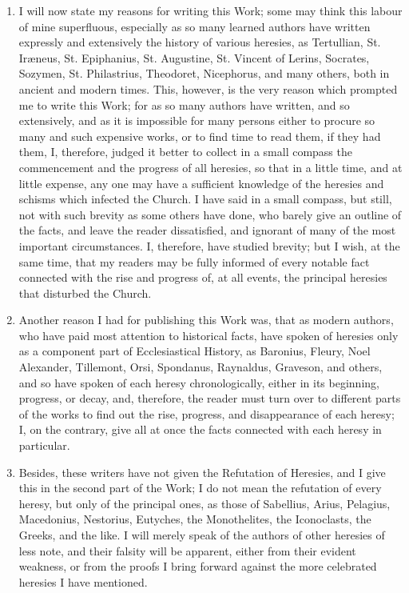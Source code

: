 \documentclass[12pt]{book}
\begin{document}
\begin{enumerate}
\item I will now state my reasons for writing this Work; some may think this labour of mine superfluous,
especially as so many learned authors have written expressly and extensively the history of various
heresies, as Tertullian, St. Ir{\ae}neus, St. Epiphanius, St. Augustine, St. Vincent of Lerins, Socrates,
Sozymen, St. Philastrius, Theodoret, Nicephorus, and many others, both in ancient and modern times.
This, however, is the very reason which prompted me to write this Work; for as so many authors have
written, and so extensively, and as it is impossible for many persons either to procure so many and such 
expensive works, or to find time to read them, if they had them, I, therefore, judged it better to collect in a
small compass the commencement and the progress of all heresies, so that in a little time, and at little
expense, any one may have a sufficient knowledge of the heresies and schisms which infected the
Church. I have said in a small compass, but still, not with such brevity as some others have done, who
barely give an outline of the facts, and leave the reader dissatisfied, and ignorant of many of the most
important circumstances. I, therefore, have studied brevity; but I wish, at the same time, that my readers
may be fully informed of every notable fact connected with the rise and progress of, at all events, the
principal heresies that disturbed the Church.

\item Another reason I had for publishing this Work was, that as modern authors, who have paid most
attention to historical facts, have spoken of heresies only as a component part of Ecclesiastical History, as
Baronius, Fleury, Noel Alexander, Tillemont, Orsi, Spondanus, Raynaldus, Graveson, and others, and so
have spoken of each heresy chronologically, either in its beginning, progress, or decay, and, therefore, the
reader must turn over to different parts of the works to find out the rise, progress, and disappearance of
each heresy; I, on the contrary, give all at once the facts connected with each heresy in particular.

\item Besides, these writers have not given the Refutation of Heresies, and I give this in the second part of
the Work; I do not mean the refutation of every heresy, but only of the principal ones, as those of
Sabellius, Arius, Pelagius, Macedonius, Nestorius, Eutyches, the Monothelites, the Iconoclasts, the
Greeks, and the like. I will merely speak of the authors of other heresies of less note, and their falsity will
be apparent, either from their evident weakness, or from the proofs I bring forward against the more
celebrated heresies I have mentioned.


\end{enumerate}
\end{document}
